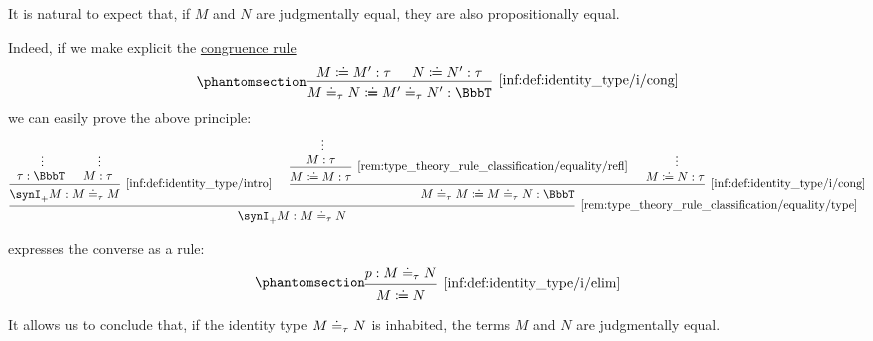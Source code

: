 \begin{definition}
  \begin{thmenum}
     It is natural to expect that, if \( M \) and \( N \) are judgmentally equal, they are also propositionally equal.

    Indeed, if we make explicit the \hyperref[rem:type_theory_rule_classification/equality/cong]{congruence rule}
    \begin{equation*}\taglabel[\ensuremath{ \coloneqq_=^{\logic{form}} }]{inf:def:identity_type/i/cong}
      \begin{prooftree}
        \hypo{ M \syndefeq M': \tau }
        \hypo{ N \syndefeq N': \tau }
        \infer2[\ref{inf:def:identity_type/i/cong}]{ M \syneq_\tau N \syndefeq M' \syneq_\tau N': \BbbT },
      \end{prooftree}
    \end{equation*}
    we can easily prove the above principle:
    \begin{equation*}
      \begin{prooftree}
        \hypo{}
        \ellipsis {} { \tau: \BbbT }

        \hypo{}
        \ellipsis {} { M: \tau }

        \infer2[\ref{inf:def:identity_type/intro}]{ \synI_+ M: M \syneq_\tau M }

        \hypo{}
        \ellipsis {} { M: \tau }
        \infer1[\ref{rem:type_theory_rule_classification/equality/refl}]{ M \syndefeq M: \tau }

        \hypo{}
        \ellipsis {} { M \syndefeq N: \tau }
        \infer2[\ref{inf:def:identity_type/i/cong}]{ M \syneq_\tau M \syndefeq M \syneq_\tau N: \BbbT }

        \infer2[\ref{rem:type_theory_rule_classification/equality/type}]{ \synI_+ M: M \syneq_\tau N }
      \end{prooftree}
    \end{equation*}

     expresses the converse as a rule:
    \begin{equation*}\taglabel[\ensuremath{ =_-^\Iota }]{inf:def:identity_type/i/elim}
      \begin{prooftree}
        \ParacolAlignmentHack
        \hypo{ p: M \syneq_\tau N }
        \infer1[\ref{inf:def:identity_type/i/elim}]{ M \syndefeq N }
      \end{prooftree}
    \end{equation*}

    It allows us to conclude that, if the identity type \( M \doteq_\tau N \) is inhabited, the terms \( M \) and \( N \) are judgmentally equal.


\end{thmenum}
\end{definition}
